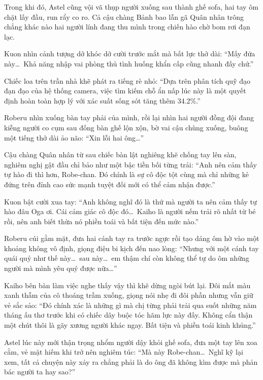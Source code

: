 \documentclass[../main.tex]{subfiles}
\begin{document}
Trong khi đó, Astel cũng vội vã thụp người xuống sau thành ghế sofa, hai tay ôm chặt lấy đầu, run rẩy co ro. Cả cậu chàng Bảnh bao lẫn gã Quân nhân trông chẳng khác nào hai người lính đang thu mình trong chiến hào chờ bom rơi đạn lạc.


Kuon nhìn cảnh tượng dở khóc dở cười trước mắt mà bất lực thở dài: ``Mấy đứa này\dots\ Khả năng nhập vai phòng thủ tình huống khẩn cấp cũng nhanh đấy chứ.''

Chiếc loa trên trần nhà khẽ phát ra tiếng rè nhỏ: ``Dựa trên phân tích quỹ đạo đạn đạo của hệ thống camera, việc tìm kiếm chỗ ẩn nấp lúc này là một quyết định hoàn toàn hợp lý với xác suất sống sót tăng thêm 34.2\%.''

Roberu nhìn xuống bàn tay phải của mình, rồi lại nhìn hai người đồng đội đang kiễng người co cụm sau đống bàn ghế lộn xộn, bờ vai cậu chùng xuống, buông một tiếng thở dài ảo não: ``Xin lỗi hai ông\dots''

Cậu chàng Quân nhân từ sau chiếc bàn lật nghiêng khẽ chống tay lên sàn, nghiêm nghị gật đầu chỉ bảo như một bậc tiền bối từng trải: ``Anh nên cảm thấy tự hào đi thì hơn, Robe-chan. Đó chính là sự cô độc tột cùng mà chỉ những kẻ đứng trên đỉnh cao sức mạnh tuyệt đối mới có thể cảm nhận được.''

Kuon bật cười xua tay: ``Anh không nghĩ đó là thứ mà người ta nên cảm thấy tự hào đâu Oga ơi. Cái cảm giác cô độc đó\dots\ Kaiho là người nếm trải rõ nhất từ bé rồi, nên anh biết thừa nó phiền toái và bất tiện đến mức nào.''

Roberu cúi gằm mặt, đưa hai cánh tay ra trước ngực rồi tạo dáng ôm hờ vào một khoảng không vô định, giọng điệu bi kịch đến nao lòng: ``Nhưng với một cánh tay quái quỷ như thế này\dots\ sau này\dots\ em thậm chí còn không thể tự do ôm những người mà mình yêu quý được nữa\dots''


Kaiho bên bàn làm việc nghe thấy vậy thì khẽ dừng ngòi bút lại. Đôi mắt màu xanh thẫm của cô thoáng trầm xuống, giọng nói nhẹ đi đôi phần nhưng vẫn giữ vẻ sắc sảo: ``Đó chính xác là những gì mà chị từng phải trải qua suốt những năm tháng ấu thơ trước khi có chiếc dây buộc tóc hãm lực này đấy. Không cẩn thận một chút thôi là gãy xương người khác ngay. Bất tiện và phiền toái kinh khủng.''

Astel lúc này mới thận trọng nhổm người dậy khỏi ghế sofa, đưa một tay lên xoa cằm, vẻ mặt hiếm khi trở nên nghiêm túc: ``Mà này Robe-chan\dots\ Nghĩ kỹ lại xem, tất cả chuyện này xảy ra chẳng phải là do ông đã không kìm được mà phản bác người ta hay sao?''
\end{document}
